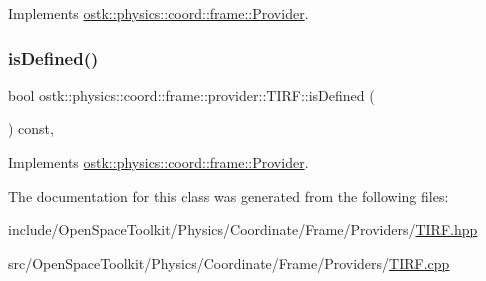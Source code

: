 Implements \hyperlink{classostk_1_1physics_1_1coord_1_1frame_1_1_provider_a38b86a589f46f8b8a9c97ab2776f37d1}{ostk\+::physics\+::coord\+::frame\+::\+Provider}.

\mbox{\label{classostk_1_1physics_1_1coord_1_1frame_1_1provider_1_1_t_i_r_f_ac7f3d815a45e270adab07bf6f51dc25f}} 
\subsubsection{\texorpdfstring{is\+Defined()}{isDefined()}}
{\footnotesize\ttfamily bool ostk\+::physics\+::coord\+::frame\+::provider\+::\+T\+I\+R\+F\+::is\+Defined (\begin{DoxyParamCaption}{ }\end{DoxyParamCaption}) const\hspace{0.3cm}{\ttfamily [override]}, {\ttfamily [virtual]}}



Implements \hyperlink{classostk_1_1physics_1_1coord_1_1frame_1_1_provider_a27acab0012649796b97956fed1a91493}{ostk\+::physics\+::coord\+::frame\+::\+Provider}.



The documentation for this class was generated from the following files\+:\begin{DoxyCompactItemize}
\item 
include/\+Open\+Space\+Toolkit/\+Physics/\+Coordinate/\+Frame/\+Providers/\hyperlink{_t_i_r_f_8hpp}{T\+I\+R\+F.\+hpp}\item 
src/\+Open\+Space\+Toolkit/\+Physics/\+Coordinate/\+Frame/\+Providers/\hyperlink{_t_i_r_f_8cpp}{T\+I\+R\+F.\+cpp}\end{DoxyCompactItemize}
